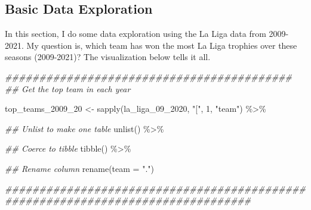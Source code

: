 \documentclass[]{tufte-handout}
\newenvironment{Shaded}{}{}
\newcommand{\AttributeTok}[1]{\textcolor[rgb]{0.49,0.56,0.16}{#1}}
\newcommand{\DecValTok}[1]{\textcolor[rgb]{0.25,0.63,0.44}{#1}}
\newcommand{\DocumentationTok}[1]{\textcolor[rgb]{0.73,0.13,0.13}{\textit{#1}}}
\newcommand{\FunctionTok}[1]{\textcolor[rgb]{0.02,0.16,0.49}{#1}}
\newcommand{\NormalTok}[1]{#1}
\newcommand{\OtherTok}[1]{\textcolor[rgb]{0.00,0.44,0.13}{#1}}
\newcommand{\SpecialCharTok}[1]{\textcolor[rgb]{0.25,0.44,0.63}{#1}}
\newcommand{\StringTok}[1]{\textcolor[rgb]{0.25,0.44,0.63}{#1}}
\begin{document}
\hypertarget{basic-data-exploration}{%
\subsection{\texorpdfstring{\textbf{Basic Data
Exploration}}{Basic Data Exploration}}\label{basic-data-exploration}}

In this section, I do some data exploration using the La Liga data from
2009-2021. My question is, which team has won the most La Liga trophies
over these seasons (2009-2021)? The visualization below tells it all.

\begin{Shaded}
\begin{Highlighting}[]
\DocumentationTok{\#\#\#\#\#\#\#\#\#\#\#\#\#\#\#\#\#\#\#\#\#\#\#\#\#\#\#\#\#\#\#\#\#\#\#\#\#\#\#\#\#\#}
\DocumentationTok{\#\# Get the top team in each year}

\NormalTok{top\_teams\_2009\_20 }\OtherTok{\textless{}{-}} \FunctionTok{sapply}\NormalTok{(la\_liga\_09\_2020, }\StringTok{"["}\NormalTok{, }\DecValTok{1}\NormalTok{, }\StringTok{"team"}\NormalTok{) }\SpecialCharTok{\%\textgreater{}\%} 
        
        \DocumentationTok{\#\# Unlist to make one table}
        \FunctionTok{unlist}\NormalTok{() }\SpecialCharTok{\%\textgreater{}\%} 
        
        \DocumentationTok{\#\# Coerce to tibble}
        \FunctionTok{tibble}\NormalTok{() }\SpecialCharTok{\%\textgreater{}\%} 
        
        \DocumentationTok{\#\# Rename column}
        \FunctionTok{rename}\NormalTok{(}\AttributeTok{team =} \StringTok{"."}\NormalTok{)}

\DocumentationTok{\#\#\#\#\#\#\#\#\#\#\#\#\#\#\#\#\#\#\#\#\#\#\#\#\#\#\#\#\#\#\#\#\#\#\#\#\#\#\#\#\#\#\#\#\#\#\#\#\#\#\#\#\#\#\#\#\#\#\#\#\#\#\#\#\#\#\#\#\#\#\#\#\#\#\#\#\#\#\#\#}
\end{Highlighting}
\end{Shaded}
\end{document}
